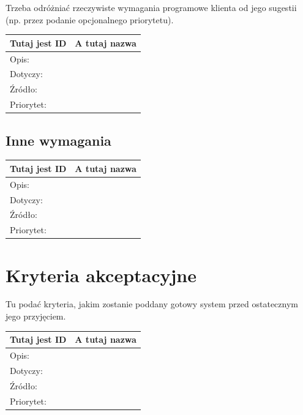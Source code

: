 \documentclass[a4paper,10pt]{article}
\begin{document}
Trzeba odróżniać rzeczywiste wymagania programowe klienta od jego sugestii (np. przez podanie opcjonalnego priorytetu).


\begin{tabular}{|p{3cm}|p{9cm}|} \hline

Tutaj jest ID & A tutaj nazwa \\ \hline
Opis: &  \\ \hline
Dotyczy: &  \\ \hline
Źródło: &  \\ \hline
Priorytet: &  \\ \hline

\end{tabular}


\subsection{Inne wymagania}
 

\begin{tabular}{|p{3cm}|p{9cm}|} \hline

Tutaj jest ID & A tutaj nazwa \\ \hline
Opis: &  \\ \hline
Dotyczy: &  \\ \hline
Źródło: &  \\ \hline
Priorytet: &  \\ \hline

\end{tabular}

 
\section{Kryteria akceptacyjne}

Tu podać kryteria, jakim zostanie poddany gotowy system przed ostatecznym jego przyjęciem.


\begin{tabular}{|p{3cm}|p{9cm}|} \hline

Tutaj jest ID & A tutaj nazwa \\ \hline
Opis: &  \\ \hline
Dotyczy: &  \\ \hline
Źródło: &  \\ \hline
Priorytet: &  \\ \hline

\end{tabular}



\clearpage
{}
{}

\end{document}
